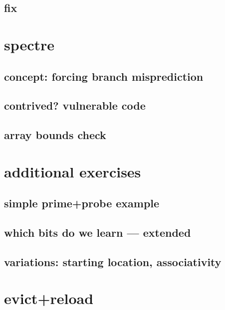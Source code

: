 \subsection{fix}


\section{spectre}

\subsection{concept: forcing branch misprediction}


\subsection{contrived? vulnerable code}


\subsection{array bounds check}


\section{additional exercises}
\subsection{simple prime+probe example}


\subsection{which bits do we learn --- extended}

\subsection{variations: starting location, associativity}


\section{evict+reload}

